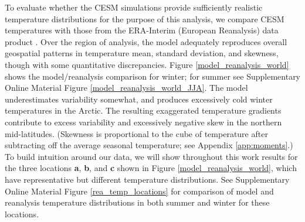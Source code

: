 \documentclass{ametsoc}
\begin{document}
To evaluate whether the CESM simulations provide sufficiently realistic temperature distributions for the purpose of this analysis, we compare CESM temperatures with those from the ERA-Interim (European Reanalysis) data product \citep{dee2011era}. Over the region of analysis, the model adequately reproduces overall geospatial patterns in temperature mean, standard deviation, and skewness, though with some quantitative discrepancies. Figure \ref{model_reanalysis_world} shows the model/reanalysis comparison for winter; for summer see Supplementary Online Material Figure \ref{model_reanalysis_world_JJA}. The model underestimates variability somewhat, and produces excessively cold winter temperatures in the Arctic. The resulting exaggerated temperature gradients contribute to excess variability and excessively negative skew in the northern mid-latitudes.
(Skewness is proportional to the cube of temperature after subtracting off the average seasonal temperature; see Appendix \ref{app:moments}.) %
 To build intuition around our data, we will show throughout this work results for the three locations \textbf{a}, \textbf{b}, and \textbf{c} shown in Figure \ref{model_reanalysis_world}, which have representative but different temperature distributions. See Supplementary Online Material Figure \ref{rea_temp_locations} for comparison of model and reanalysis temperature distributions in both summer and winter for these locations. 
 
\end{document}
